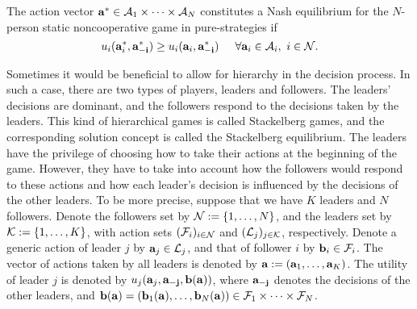 \begin{definition} The action vector $\mathbf{a^*} \in {\cal A}_1\times\dots\times{\cal A}_N$ constitutes a Nash equilibrium for the $N$-person static noncooperative game in pure-strategies if 
\begin{equation}u_i({\bf{a}}^*_i,\mathbf{a^*_{-i}}) \geq u_i({\bf{a}}_i,\mathbf{a^*_{-i}}) \hspace{0.2in} \forall {\bf{a}}_i\in{\cal A}_i, \ i \in {\cal N}. \label{NE}\end{equation} \end{definition}
Sometimes it would be beneficial to allow for hierarchy in the decision process. In such a case, there are two types of players, leaders and followers. The leaders' decisions are dominant, and the followers respond to the decisions taken by the leaders. This kind of {\color{blue}hierarchical} games is called Stackelberg games, and the corresponding solution concept is called the Stackelberg equilibrium. %
 The leaders have the privilege of choosing how to take their actions at the beginning of the game. However, they have to take into account how the followers would respond to these actions and how each leader's decision is influenced by the decisions of the other leaders. To be more precise, suppose that we have $K$ leaders and $N$ followers. Denote the followers set by ${\cal N} := \{1,\dots,N\}$, and the leaders set by ${\cal K} := \{1,\dots,K\}$, with action sets $({\cal F}_i)_{i\in {\cal N}}$ and $({\cal L}_j)_{j\in {\cal K}}$, respectively. Denote a generic action of leader $j$ by ${\bf{a}}_{j}\in{\cal L}_j$, and that of follower $i$ by  ${\bf{b}}_i\in{\cal F}_i$. The vector of actions taken by all leaders is denoted by $\mathbf{a}:=({\bf{a}}_1,\dots,{\bf{a}}_K)$. The utility of leader $j$ is denoted by $u_j({\bf{a}}_j,\mathbf{{\bf{a}}_{-j}},\mathbf{b(a)})$, where $\mathbf{{\bf{a}}_{-j}}$ denotes the decisions of the other leaders, and $\mathbf{b(a)}=({\bf{b}}_1(\mathbf{a}),\dots,{\bf{b}}_N(\mathbf{a}))\in {\cal F}_1 \times \dots \times {\cal F}_N$. 


